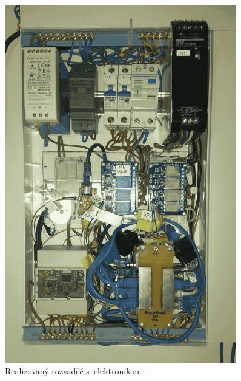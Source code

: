 \begin{figure}[H]
    \centering
    \includegraphics[width=0.9\textwidth]{images/rozvadec-ve-sklepe-s-elektronikou.png}
    \caption{Realizovaný rozvaděč s~elektronikou.}
    \label{fig:rozvadec-ve-sklepe-s-elektronikou}
\end{figure}







